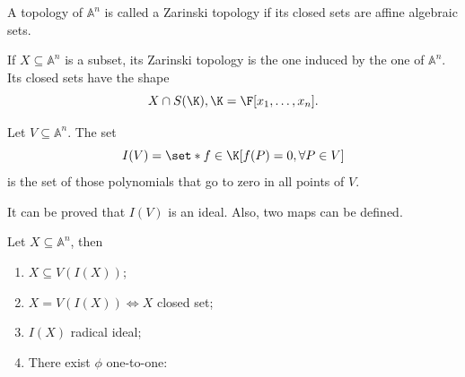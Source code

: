 \documentclass{subfiles}
\begin{document}
    \begin{definition*}
        A topology of \(\mathbb{A}^{n}\) is called a Zarinski topology if its closed sets 
            are affine algebraic sets.

        If \(X \subseteq \mathbb{A}^{n}\) is a subset, its Zarinski topology is the one
            induced by the one of \(\mathbb{A}^{n}\). Its closed sets have the shape 
            \[
                X \cap S(\K), \K = \F[x_{1}, \ldots, x_{n}].
            \]
    \end{definition*}

    \begin{definition*}
        Let \(V \subseteq \mathbb{A}^{n}\). 
            The set 
            \[
                I(V) = \set*{f \in \K}[f(P) = 0, \forall P \in V]
            \]
            is the set of those polynomials that go to zero in all points of  \(V\).
    \end{definition*}

    \begin{remark*}
        It can be proved that \(I(V)\) is an ideal. Also, two maps can be defined.
        
    \end{remark*}
    \clearpage

    \begin{proposition*}
        Let \(X \subseteq \mathbb{A}^{n}\), then 
        \begin{enumerate}
            \item \(X \subseteq V(I(X))\);
            \item \(X = V(I(X)) \iff X\) closed set;
            \item \(I(X)\) radical ideal;
            \item There exist \(\phi\) one-to-one:
                
        \end{enumerate}
    \end{proposition*}
\end{document}
